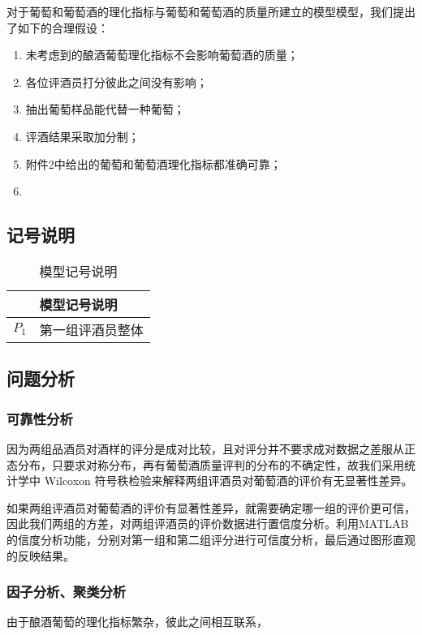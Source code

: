 \documentclass{cumcmart}
\begin{document}
    对于葡萄和葡萄酒的理化指标与葡萄和葡萄酒的质量所建立的模型模型，我们提出了如下的合理假设：
    \begin{enumerate}
        \item 未考虑到的酿酒葡萄理化指标不会影响葡萄酒的质量；
        \item 各位评酒员打分彼此之间没有影响；
        \item 抽出葡萄样品能代替一种葡萄；
        \item 评酒结果采取加分制；
        \item 附件2中给出的葡萄和葡萄酒理化指标都准确可靠；
        \item 
    \end{enumerate}

    \subsection{记号说明}

    \begin{table}[!htbp]
        \centering
        \begin{tabular}{cl}
        \toprule
        \multicolumn{2}{c}{\large 模型记号说明}\\
        \midrule
            ${P_1}$ &   第一组评酒员整体
            

        \bottomrule
        \end{tabular}
        \caption{模型记号说明}
    \end{table}

    \subsection{问题分析}

        \subsubsection{可靠性分析}
        因为两组品酒员对酒样的评分是成对比较，且对评分并不要求成对数据之差服从正态分布，只要求对称分布，再有葡萄酒质量评判的分布的不确定性，故我们采用统计学中 Wilcoxon 符号秩检验来解释两组评酒员对葡萄酒的评价有无显著性差异。

        如果两组评酒员对葡萄酒的评价有显著性差异，就需要确定哪一组的评价更可信，因此我们两组的方差，对两组评酒员的评价数据进行置信度分析。利用MATLAB的信度分析功能，分别对第一组和第二组评分进行可信度分析，最后通过图形直观的反映结果。

        \subsubsection{因子分析、聚类分析}
        由于酿酒葡萄的理化指标繁杂，彼此之间相互联系，
\end{document}
